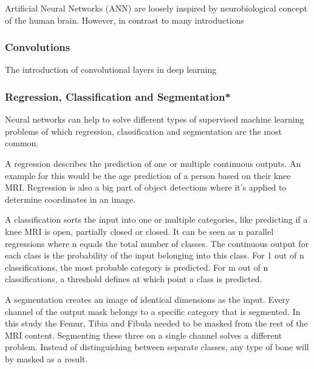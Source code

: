 Artificial Neural Networks (ANN) are loosely inspired by neurobiological concept of the human brain. However, in contrast to many introductions 

\subsubsection{Convolutions}

The introduction of convolutional layers in deep learning 

\subsubsection{Regression, Classification and Segmentation*}

Neural networks can help to solve different types of supervised machine learning problems of which regression, classification and segmentation are the most common.

A regression describes the prediction of one or multiple continuous outputs. An example for this would be the age prediction of a person based on their knee MRI. Regression is also a big part of object detections where it's applied to determine coordinates in an image.

A classification sorts the input into one or multiple categories, like predicting if a knee MRI is open, partially closed or closed. It can be seen as n parallel regressions where n equals the total number of classes. The continuous output for each class is the probability of the input belonging into this class. For 1 out of n classifications, the most probable category is predicted. For m out of n classifications, a threshold defines at which point a class is predicted.

A segmentation creates an image of identical dimensions as the input. Every channel of the output mask belongs to a specific category that is segmented. In this study the Femur, Tibia and Fibula needed to be masked from the rest of the MRI content. Segmenting these three on a single channel solves a different problem. Instead of distinguishing between separate classes, any type of bone will by masked as a result.

\newpage